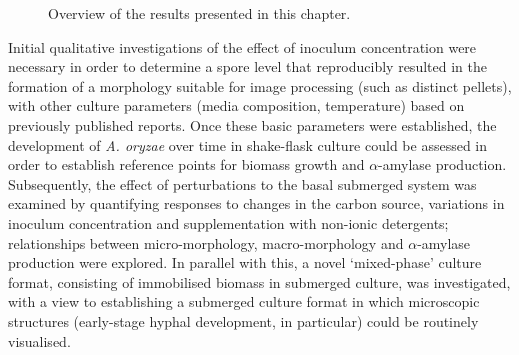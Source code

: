 \begin{figure}[htbp]
	\centering
	\caption{Overview of the results presented in this chapter.}
	\label{fig:C5Overview}
\end{figure}

Initial qualitative investigations of the effect of inoculum concentration were necessary in order to determine a spore level that reproducibly resulted in the formation of a morphology suitable for image processing (such as distinct pellets), with other culture parameters (media composition, temperature) based on previously published reports. Once these basic parameters were established, the development of \emph{A. oryzae} over time in shake-flask culture could be assessed in order to establish reference points for biomass growth and $\alpha$-amylase production. Subsequently, the effect of perturbations to the basal submerged system was examined by quantifying responses to changes in the carbon source, variations in inoculum concentration and supplementation with non-ionic detergents; relationships between micro-morphology, macro-morphology and $\alpha$-amylase production were explored. In parallel with this, a novel \lq mixed-phase' culture format, consisting of immobilised biomass in submerged culture, was investigated, with a view to establishing a submerged culture format in which microscopic structures (early-stage hyphal development, in particular) could be routinely visualised.